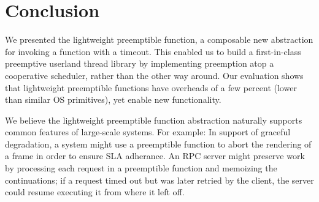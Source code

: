 \section{Conclusion}

We presented the lightweight preemptible function, a composable new abstraction
for invoking a function with a timeout.  This enabled us to build a first-in-class
preemptive userland thread library by implementing preemption atop a cooperative
scheduler, rather than the other way around.  Our evaluation shows that lightweight
preemptible functions have overheads of a few percent (lower than similar OS
primitives), yet enable new functionality.

We believe the lightweight preemptible function abstraction naturally supports
common features of large-scale systems.  For example:  In support of graceful
degradation, a system might use a preemptible function to abort the rendering of a
frame in order to ensure SLA adherance.  An RPC server might preserve work by
processing each request in a preemptible function and memoizing the continuations; if
a request timed out but was later retried by the client, the server could resume
executing it from where it left off.
